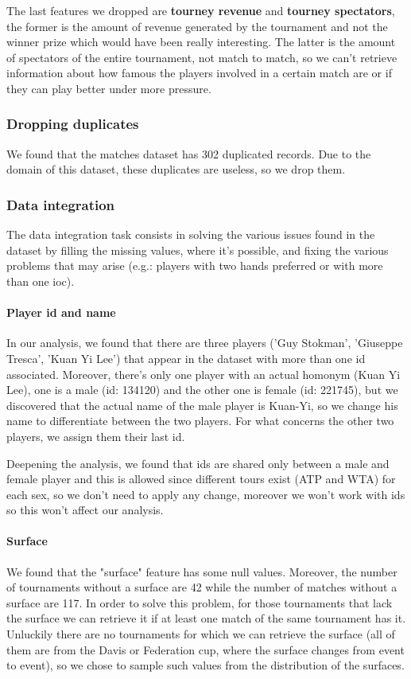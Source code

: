 The last features we dropped are \textbf{tourney revenue} and \textbf{tourney spectators}, the former is the amount of revenue generated by the tournament and not the winner prize which would have been really interesting. The latter is the amount of spectators of the entire tournament, not match to match, so we can't retrieve information about how famous the players involved in a certain match are or if they can play better under more pressure.

\subsubsection{Dropping duplicates}
We found that the matches dataset has 302 duplicated records. Due to the domain of this dataset, these duplicates are useless, so we drop them.

\subsubsection{Data integration}
The data integration task consists in solving the various issues found in the dataset by filling the missing values, where it's possible, and fixing the various problems that may arise (e.g.: players with two hands preferred or with more than one ioc).
\paragraph{Player id and name}
In our analysis, we found that there are three players ('Guy Stokman', 'Giuseppe Tresca', 'Kuan Yi Lee') that appear in the dataset with more than one id associated. Moreover, there's only one player with an actual homonym (Kuan Yi Lee), one is a male (id: 134120) and the other one is female (id: 221745), but we discovered that the actual name of the male player is Kuan-Yi, so we change his name to differentiate between the two players. For what concerns the other two players, we assign them their last id.

Deepening the analysis, we found that ids are shared only between a male and female player and this is allowed since different tours exist (ATP and WTA) for each sex, so we don't need to apply any change, moreover we won't work with ids so this won't affect our analysis.

\paragraph{Surface}
We found that the "surface" feature has some null values. Moreover, the number of tournaments without a surface are 42 while the number of matches without a surface are 117. In order to solve this problem, for those tournaments that lack the surface  we can retrieve it if at least one match of the same tournament has it. Unluckily there are no tournaments for which we can retrieve the surface (all of them are from the Davis or Federation cup, where the surface changes from event to event), so we chose to sample such values from the distribution of the surfaces.

